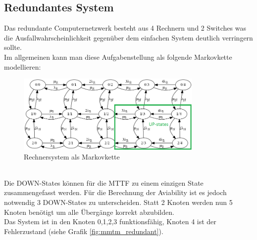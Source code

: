 \documentclass[10pt,a4paper]{article}
\begin{document}
\subsection{Redundantes System}
Das redundante Computernetzwerk besteht aus 4 Rechnern und 2 Switches was die Ausfallwahrscheinlichkeit gegenüber dem einfachen System deutlich verringern sollte.\\
Im allgemeinen kann man diese Aufgabenstellung als folgende Markovkette modellieren: 
\begin{figure}[h]
\centering
\includegraphics[width=90mm]{zustandsdiagramm_markov.png}
\caption{Rechnersystem als Markovkette\label{mmtm_model}}
\end{figure}\\
Die DOWN-States können für die MTTF zu einem einzigen State 
zusammengefasst werden. Für die Berechnung der Aviability ist es jedoch 
notwendig 3 DOWN-States zu unterscheiden.
Statt 2 Knoten werden nun 5 Knoten benötigt um alle Übergänge korrekt abzubilden.\\
Das System ist in den Knoten 0,1,2,3 funktionsfähig, Knoten 4 ist der Fehlerzustand (siehe Grafik \ref{fig:mmtm_redundant}).\\\\
\end{document}
